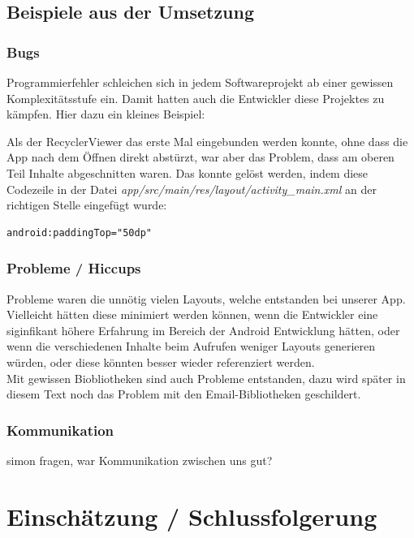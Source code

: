 \documentclass[a4paper,11pt]{article}
\begin{document}
\subsection{Beispiele aus der Umsetzung}
\subsubsection{Bugs}
Programmierfehler schleichen sich in jedem Softwareprojekt ab einer gewissen Komplexitätsstufe ein. Damit hatten auch die Entwickler diese Projektes zu kämpfen. Hier dazu ein kleines Beispiel:

Als der RecyclerViewer das erste Mal eingebunden werden konnte, ohne dass die App nach dem Öffnen direkt abstürzt, war aber das Problem, dass am oberen Teil Inhalte abgeschnitten waren. Das konnte gelöst werden, indem diese Codezeile in der Datei \textit{app/src/main/res/layout/activity\_main.xml} an der richtigen Stelle eingefügt wurde:

\lstset{language=XML}
\begin{lstlisting}
android:paddingTop="50dp"
\end{lstlisting}

\subsubsection{Probleme / Hiccups}
Probleme waren die unnötig vielen Layouts, welche entstanden bei unserer App. Vielleicht hätten diese minimiert werden können, wenn die Entwickler eine siginfikant höhere Erfahrung im Bereich der Android Entwicklung hätten, oder wenn die verschiedenen Inhalte beim Aufrufen weniger Layouts generieren würden, oder diese könnten besser wieder referenziert werden.\\

Mit gewissen Biobliotheken sind auch Probleme entstanden, dazu wird später in diesem Text noch das Problem mit den Email-Bibliotheken geschildert.

\subsubsection{Kommunikation}
simon fragen, war Kommunikation zwischen uns gut?

\section{Einschätzung / Schlussfolgerung}
\end{document}
